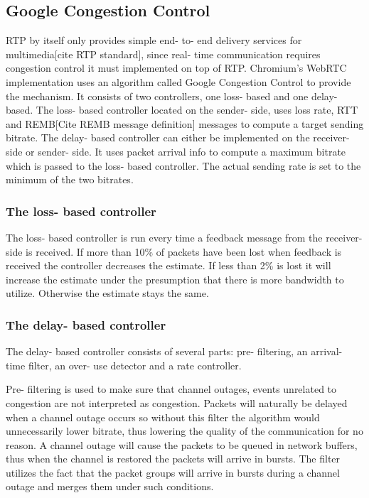\documentclass[UKenglish]{ifimaster}
\begin{document}
\subsection{Google Congestion Control}
RTP by itself only provides simple end- to- end delivery services for multimedia[cite RTP standard], since real- time communication requires congestion control it must implemented on top of RTP. 
Chromium's WebRTC implementation uses an algorithm called Google Congestion Control \cite{draft-ietf-rmcat-gcc} to provide the mechanism.
It consists of two controllers, one loss- based and one delay- based. 
The loss- based controller located on the sender- side, uses loss rate, RTT and REMB[Cite REMB message definition] messages to compute a target sending bitrate. 
The delay- based controller can either be implemented on the receiver- side or sender- side.
It uses packet arrival info to compute a maximum bitrate which is passed to the loss- based controller. The actual sending rate is set to the minimum of the two bitrates.
\subsubsection{The loss- based controller}
The loss- based controller is run every time a feedback message from the receiver- side is received. 
If more than 10\% of packets have been lost when feedback is received the controller decreases the estimate. 
If less than 2\% is lost it will increase the estimate under the presumption that there is more bandwidth to utilize. 
Otherwise the estimate stays the same.
\subsubsection{The delay- based controller}
 The delay- based controller consists of several parts: pre- filtering, an arrival- time filter, an over- use detector and a rate controller. %

 Pre- filtering is used to make sure that channel outages, events unrelated to congestion are not interpreted as congestion.
Packets will naturally be delayed when a channel outage occurs so without this filter the algorithm would unnecessarily lower bitrate, thus lowering the quality of the communication for no reason.
A channel outage will cause the packets to be queued in network buffers, thus when the channel is restored the packets will arrive in bursts. 
The filter utilizes the fact that the packet groups will arrive in bursts during a channel outage and merges them under such conditions.
\end{document}
